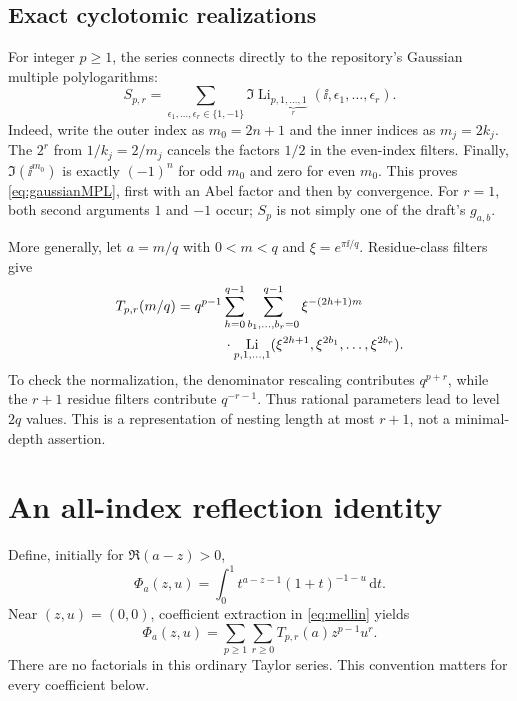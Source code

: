 \documentclass[11pt]{article}
\numberwithin{equation}{section}
\theoremstyle{definition}\newtheorem{definition}[theorem]{Definition}
\theoremstyle{remark}\newtheorem{remark}[theorem]{Remark}
\DeclareMathOperator{\Li}{Li}
\newcommand{\dd}{\,\mathrm d}
\begin{document}
\subsection{Exact cyclotomic realizations}
For integer $p\ge1$, the series connects directly to the repository's Gaussian multiple polylogarithms:
\begin{equation}\label{eq:gaussianMPL}
 S_{p,r}=\sum_{\epsilon_1,\ldots,\epsilon_r\in\{1,-1\}}
 \Im\Li_{p,\underbrace{1,\ldots,1}_{r}}
               (\ii,\epsilon_1,\ldots,\epsilon_r).
\end{equation}
Indeed, write the outer index as $m_0=2n+1$ and the inner indices as $m_j=2k_j$. The $2^r$ from $1/k_j=2/m_j$ cancels the factors $1/2$ in the even-index filters. Finally,
$\Im(\ii^{m_0})$ is exactly $(-1)^n$ for odd $m_0$ and zero for even $m_0$. This proves \eqref{eq:gaussianMPL}, first with an Abel factor and then by convergence. For $r=1$, both second arguments $1$ and $-1$ occur; $S_p$ is not simply one of the draft's $g_{a,b}$.

More generally, let $a=m/q$ with $0<m<q$ and $\xi=e^{\pi\ii/q}$. Residue-class filters give
\begin{align}\label{eq:rationalMPL}
 T_{p,r}(m/q)
 &=q^{p-1}\sum_{h=0}^{q-1}\sum_{b_1,\ldots,b_r=0}^{q-1}
   \xi^{-(2h+1)m} \\
 &\hspace{12mm}\cdot\Li_{p,1,\ldots,1}
 (\xi^{2h+1},\xi^{2b_1},\ldots,\xi^{2b_r}).\notag
\end{align}
To check the normalization, the denominator rescaling contributes $q^{p+r}$, while the $r+1$ residue filters contribute $q^{-r-1}$. Thus rational parameters lead to level $2q$ values. This is a representation of nesting length at most $r+1$, not a minimal-depth assertion.

\section{An all-index reflection identity}
\label{sec:reflection}

Define, initially for $\Re(a-z)>0$,
\begin{equation}\label{eq:Phi}
 \Phi_a(z,u)=\int_0^1 t^{a-z-1}(1+t)^{-1-u}\dd t.
\end{equation}
Near $(z,u)=(0,0)$, coefficient extraction in \eqref{eq:mellin} yields
\begin{equation}\label{eq:PhiTaylor}
 \Phi_a(z,u)=\sum_{p\ge1}\sum_{r\ge0}T_{p,r}(a)z^{p-1}u^r.
\end{equation}
There are no factorials in this ordinary Taylor series. This convention matters for every coefficient below.
\end{document}
